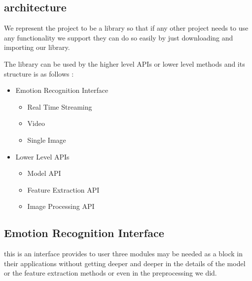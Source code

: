 \subsection{architecture}
We represent the project to be a library so that if any other project needs to use any functionality we support they can do so easily by just downloading and importing our library.
\bigbreak

The library can be used by the higher level APIs or 
lower level methods and its structure is as follows :
\begin{itemize}
	\item Emotion Recognition Interface 
	\begin{itemize}
		\item Real Time Streaming
		\item Video
		\item Single Image
	\end{itemize}
	\item Lower Level APIs
	\begin{itemize}
		\item Model API
		\item Feature Extraction API
		\item Image Processing API
	\end{itemize}
\end{itemize}

\newpage

\begin{center}
	\subsection{Emotion Recognition Interface}
	this is an interface provides to user three modules may be needed as a block in their applications without getting deeper and deeper in the details of the model or the feature extraction methods or even in the preprocessing we did.   
\end{center}
\newpage

